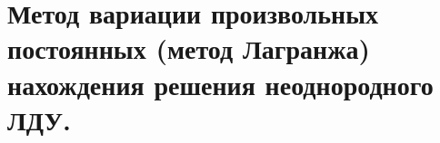 {
	\section{Метод вариации произвольных постоянных (метод Лагранжа) нахождения решения неоднородного ЛДУ.}

	\newpage
}